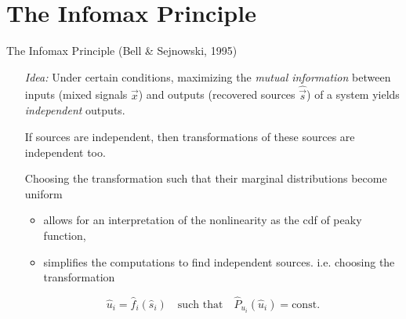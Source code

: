 
\section{The Infomax Principle}


\begin{frame}{The Infomax Principle (Bell \& Sejnowski, 1995)}

\begin{itemize}
\item[\emph{Idea:}] Under certain conditions, maximizing the
  \emph{mutual information} between inputs (mixed signals $\vec x$) and outputs
  (recovered sources $\widehat{\vec s}$) of a system yields \emph{independent} outputs.\\
  
  \svspace{5mm}
  
\item[]
  If sources are independent, then
  transformations of these sources are independent too.\\
  
  \svspace{5mm}
  
\item[]  
  Choosing the transformation such that their marginal distributions become uniform
  \begin{itemize}
  \item allows for an interpretation of the nonlinearity as the cdf of peaky function,
  \item simplifies the computations to find independent sources. i.e. choosing the transformation \\
  \end{itemize}
  
\begin{equation}
\widehat{u}_i = \widehat{f}_i(\widehat{s}_i)
\quad \text{such that} \quad
\widehat{P}_{u_i}(\widehat{u}_i) = \mathrm{const.}
\label{eq:transfconst}
\end{equation}

\end{itemize}

\end{frame}

